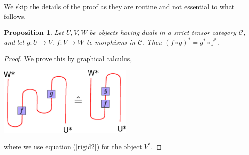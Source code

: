 \documentclass[a4paper, 10pt]{book}
\newtheorem{Prop}[theorem]{Proposition}
\theoremstyle{definition}
\numberwithin{equation}{chapter}
\newcommand\id{\operatorname{id}}
\newcommand\ot{\otimes}
\newcommand\C{\mathcal C}
\newcommand\ev{\operatorname{ev}}
\newcommand\coev{\operatorname{coev}}
\begin{document}
We skip the details of the proof as they are routine and not essential to what follows.
\begin{Prop}
Let $U, V, W$ be objects having duals in a strict tensor category $\C$, and let $g: U\rightarrow V$, $ f:V\rightarrow W$ be morphisms in $\C$. Then $(f \circ g)^* = g^*\circ f^*$.
\end{Prop}
\begin{proof}
We prove this by graphical calculus,
\begin{center}
\includegraphics[width=0.5\textwidth]{dualcomposition.eps}
\end{center}
where we use equation (\ref{rigid2}) for the object $V^*$.

\end{proof}
\end{document}

